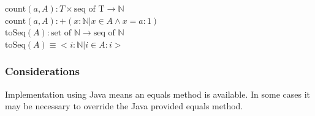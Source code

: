 \documentclass[12pt,fleqn]{examtst}
\begin{document}
\noindent $\mbox{count}(a, A): T \times \mbox{seq of T} \rightarrow \mathbb{N}$\\
\noindent $\mbox{count}(a, A): + (x: \mathbb{N} | x \in A \wedge x = a : 1)$\\

\noindent $\mbox{toSeq}(A): \mbox{set of } \mathbb{N} \rightarrow \mbox{seq of }
\mathbb{N}$\\
\noindent $\mbox{toSeq}(A) \equiv < i: \mathbb{N} | i \in A : i > $

\subsubsection* {Considerations}

Implementation using Java means an equals method is available.  In some cases it
may be necessary to override the Java provided equals method.


\newpage
\end{document}
